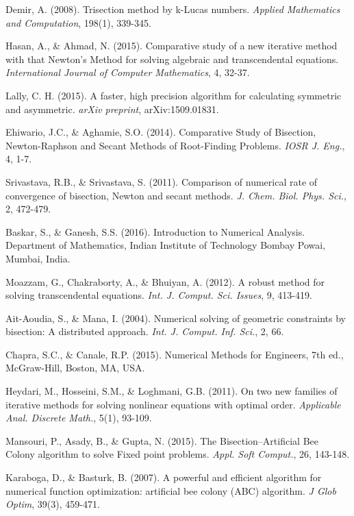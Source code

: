 \documentclass[amsmath, amssymb, aps]{revtex4-2}
\begin{document}
\begin{thebibliography}{99}
Demir, A. (2008). Trisection method by k-Lucas numbers. \textit{Applied Mathematics and Computation}, 198(1), 339-345.

Hasan, A., \& Ahmad, N. (2015). Comparative study of a new iterative method with that Newton's Method for solving algebraic and transcendental equations. \textit{International Journal of Computer Mathematics}, 4, 32-37.

Lally, C. H. (2015). A faster, high precision algorithm for calculating symmetric and asymmetric. \textit{arXiv preprint}, arXiv:1509.01831.

Ehiwario, J.C., \& Aghamie, S.O. (2014). Comparative Study of Bisection, Newton-Raphson and Secant Methods of Root-Finding Problems. \textit{IOSR J. Eng.}, 4, 1-7.

Srivastava, R.B., \& Srivastava, S. (2011). Comparison of numerical rate of convergence of bisection, Newton and secant methods. \textit{J. Chem. Biol. Phys. Sci.}, 2, 472-479.

Baskar, S., \& Ganesh, S.S. (2016). Introduction to Numerical Analysis. Department of Mathematics, Indian Institute of Technology Bombay Powai, Mumbai, India.

Moazzam, G., Chakraborty, A., \& Bhuiyan, A. (2012). A robust method for solving transcendental equations. \textit{Int. J. Comput. Sci. Issues}, 9, 413-419.

Ait-Aoudia, S., \& Mana, I. (2004). Numerical solving of geometric constraints by bisection: A distributed approach. \textit{Int. J. Comput. Inf. Sci.}, 2, 66.

Chapra, S.C., \& Canale, R.P. (2015). Numerical Methods for Engineers, 7th ed., McGraw-Hill, Boston, MA, USA.

Heydari, M., Hosseini, S.M., \& Loghmani, G.B. (2011). On two new families of iterative methods for solving nonlinear equations with optimal order. \textit{Applicable Anal. Discrete Math.}, 5(1), 93-109.

Mansouri, P., Asady, B., \& Gupta, N. (2015). The Bisection–Artificial Bee Colony algorithm to solve Fixed point problems. \textit{Appl. Soft Comput.}, 26, 143-148.

Karaboga, D., \& Basturk, B. (2007). A powerful and efficient algorithm for numerical function optimization: artificial bee colony (ABC) algorithm. \textit{J Glob Optim}, 39(3), 459-471.


\end{thebibliography}
\end{document}
